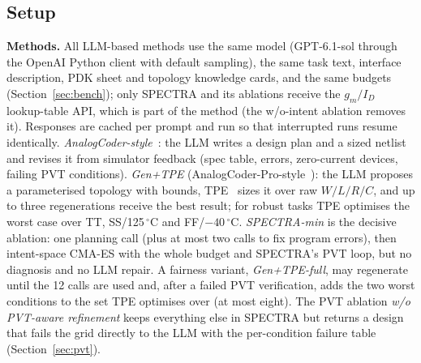 \subsection{Setup}
\label{sec:setup}
\textbf{Methods.} All LLM-based methods use the same model (GPT-6.1-sol through the OpenAI Python client with default
sampling), the same task text, interface description, PDK sheet and topology knowledge cards, and the same budgets
(Section~\ref{sec:bench}); only SPECTRA and its ablations receive the $g_m/I_D$ lookup-table API, which is part of the
method (the w/o-intent ablation removes it). Responses are cached per prompt and run so that interrupted runs resume
identically. \emph{AnalogCoder-style}~\cite{lai2025analogcoder}: the LLM writes a design plan and a
sized netlist and revises it from simulator feedback (spec table, errors, zero-current devices, failing PVT
conditions). \emph{Gen+TPE} (AnalogCoder-Pro-style~\cite{lai2026analogcoderpro}): the LLM proposes a parameterised
topology with bounds, TPE~\cite{bergstra2011tpe,akiba2019optuna} sizes it over raw $W/L/R/C$, and up to three
regenerations receive the best result; for robust tasks TPE optimises the worst case over TT, SS/125\,$^\circ$C and
FF/$-40\,^\circ$C. \emph{SPECTRA-min} is the decisive ablation: one planning call (plus at most two calls to fix program errors), then
intent-space CMA-ES with the whole budget and SPECTRA's PVT loop, but no diagnosis and no LLM repair.
A fairness variant, \emph{Gen+TPE-full}, may regenerate until the 12 calls are used and, after a failed PVT
verification, adds the two worst conditions to the set TPE optimises over (at most eight). The PVT ablation
\emph{w/o PVT-aware refinement} keeps everything else in SPECTRA but returns a design that fails the grid directly to
the LLM with the per-condition failure table (Section~\ref{sec:pvt}).

